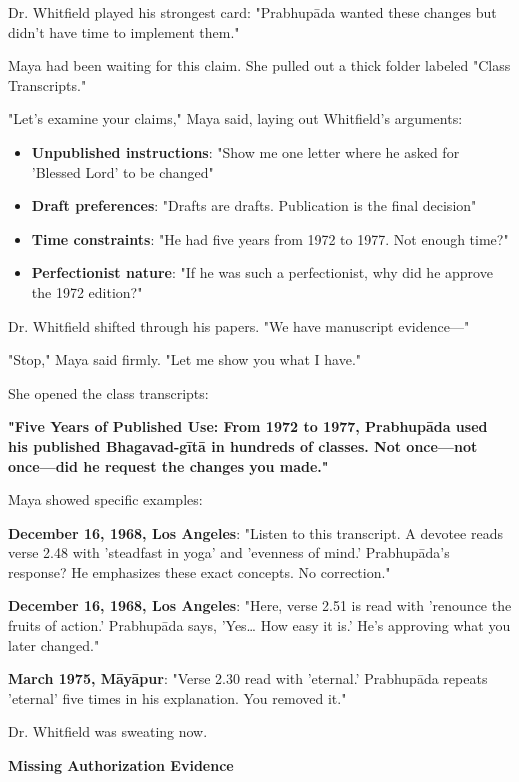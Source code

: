 \documentclass[12pt,twoside]{book}
\begin{document}
Dr. Whitfield played his strongest card: "Prabhupāda wanted these changes but didn't have time to implement them."

Maya had been waiting for this claim. She pulled out a thick folder labeled "Class Transcripts."

"Let's examine your claims," Maya said, laying out Whitfield's arguments:

\begin{itemize}
\item \textbf{\textbf{Unpublished instructions}}: "Show me one letter where he asked for 'Blessed Lord' to be changed"
\item \textbf{\textbf{Draft preferences}}: "Drafts are drafts. Publication is the final decision"
\item \textbf{\textbf{Time constraints}}: "He had five years from 1972 to 1977. Not enough time?"
\item \textbf{\textbf{Perfectionist nature}}: "If he was such a perfectionist, why did he approve the 1972 edition?"
\end{itemize}

Dr. Whitfield shifted through his papers. "We have manuscript evidence—"

"Stop," Maya said firmly. "Let me show you what I have."

She opened the class transcripts:

\textbf{\textbf{"Five Years of Published Use: From 1972 to 1977, Prabhupāda used his published Bhagavad-gītā in hundreds of classes. Not once—not once—did he request the changes you made."}}

Maya showed specific examples:

\textbf{\textbf{December 16, 1968, Los Angeles}}: "Listen to this transcript. A devotee reads verse 2.48 with 'steadfast in yoga' and 'evenness of mind.' Prabhupāda's response? He emphasizes these exact concepts. No correction."

\textbf{\textbf{December 16, 1968, Los Angeles}}: "Here, verse 2.51 is read with 'renounce the fruits of action.' Prabhupāda says, 'Yes\ldots{} How easy it is.' He's approving what you later changed."

\textbf{\textbf{March 1975, Māyāpur}}: "Verse 2.30 read with 'eternal.' Prabhupāda repeats 'eternal' five times in his explanation. You removed it."

Dr. Whitfield was sweating now.

\textbf{\textbf{Missing Authorization Evidence}}
\end{document}
